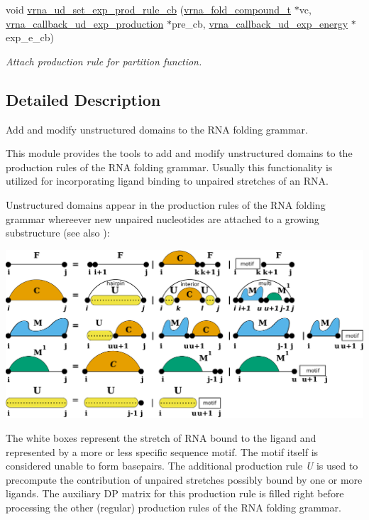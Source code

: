 \begin{DoxyCompactItemize}
void \hyperlink{group__domains__up_ga2fb1db2099da26c76247e1209ad4aa09}{vrna\+\_\+ud\+\_\+set\+\_\+exp\+\_\+prod\+\_\+rule\+\_\+cb} (\hyperlink{group__fold__compound_ga1b0cef17fd40466cef5968eaeeff6166}{vrna\+\_\+fold\+\_\+compound\+\_\+t} $\ast$vc, \hyperlink{group__domains__up_gae4c18aa60c657a4a856a4b41a9fbc0dc}{vrna\+\_\+callback\+\_\+ud\+\_\+exp\+\_\+production} $\ast$pre\+\_\+cb, \hyperlink{group__domains__up_ga79eb0224b0b6e0a86c9e8c4a1b0cad04}{vrna\+\_\+callback\+\_\+ud\+\_\+exp\+\_\+energy} $\ast$exp\+\_\+e\+\_\+cb)
\begin{DoxyCompactList}\small\item\em Attach production rule for partition function. \end{DoxyCompactList}\end{DoxyCompactItemize}


\subsection{Detailed Description}
Add and modify unstructured domains to the R\+NA folding grammar. 

This module provides the tools to add and modify unstructured domains to the production rules of the R\+NA folding grammar. Usually this functionality is utilized for incorporating ligand binding to unpaired stretches of an R\+NA.

Unstructured domains appear in the production rules of the R\+NA folding grammar whereever new unpaired nucleotides are attached to a growing substructure (see also \cite{lorenz:2016b})\+:  
\begin{DoxyImageNoCaption}
  \mbox{\includegraphics[width=\textwidth,height=\textheight/2,keepaspectratio=true]{Crecursion}}
\end{DoxyImageNoCaption}


The white boxes represent the stretch of R\+NA bound to the ligand and represented by a more or less specific sequence motif. The motif itself is considered unable to form basepairs. The additional production rule {\itshape U} is used to precompute the contribution of unpaired stretches possibly bound by one or more ligands. The auxiliary DP matrix for this production rule is filled right before processing the other (regular) production rules of the R\+NA folding grammar.

